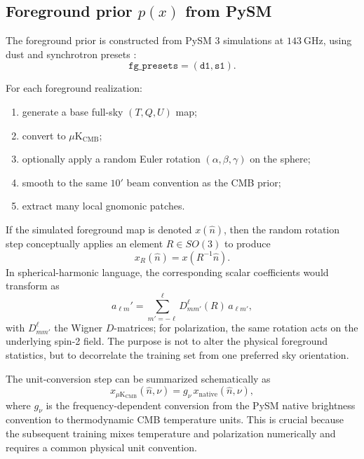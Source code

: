 \documentclass[11pt]{article}
\begin{document}
\subsection{Foreground prior \(p(x)\) from PySM}

The foreground prior is constructed from PySM 3 simulations at \(143\ \mathrm{GHz}\), using dust and synchrotron presets \cite{thorne2017pysm,zonca2021pysm3}:
\begin{equation}
  \texttt{fg\_presets} = (\texttt{d1}, \texttt{s1}).
\end{equation}

For each foreground realization:
\begin{enumerate}[leftmargin=1.5em]
  \item generate a base full-sky \((T,Q,U)\) map;
  \item convert to \(\mu\mathrm{K}_{\mathrm{CMB}}\);
  \item optionally apply a random Euler rotation \((\alpha,\beta,\gamma)\) on the sphere;
  \item smooth to the same \(10'\) beam convention as the CMB prior;
  \item extract many local gnomonic patches.
\end{enumerate}

If the simulated foreground map is denoted \(x(\hat n)\), then the random rotation step conceptually applies an element \(R\in SO(3)\) to produce
\begin{equation}
  x_R(\hat n) = x(R^{-1}\hat n).
\end{equation}
In spherical-harmonic language, the corresponding scalar coefficients would transform as
\begin{equation}
  a_{\ell m}' = \sum_{m'=-\ell}^{\ell} D_{m m'}^\ell(R)\,a_{\ell m'},
\end{equation}
with \(D_{mm'}^\ell\) the Wigner \(D\)-matrices; for polarization, the same rotation acts on the underlying spin-2 field. The purpose is not to alter the physical foreground statistics, but to decorrelate the training set from one preferred sky orientation.

The unit-conversion step can be summarized schematically as
\begin{equation}
  x_{\mu\mathrm{K}_{\mathrm{CMB}}}(\hat n,\nu)
  =
  g_{\nu}\,x_{\mathrm{native}}(\hat n,\nu),
\end{equation}
where \(g_\nu\) is the frequency-dependent conversion from the PySM native brightness convention to thermodynamic CMB temperature units. This is crucial because the subsequent training mixes temperature and polarization numerically and requires a common physical unit convention.
\end{document}
